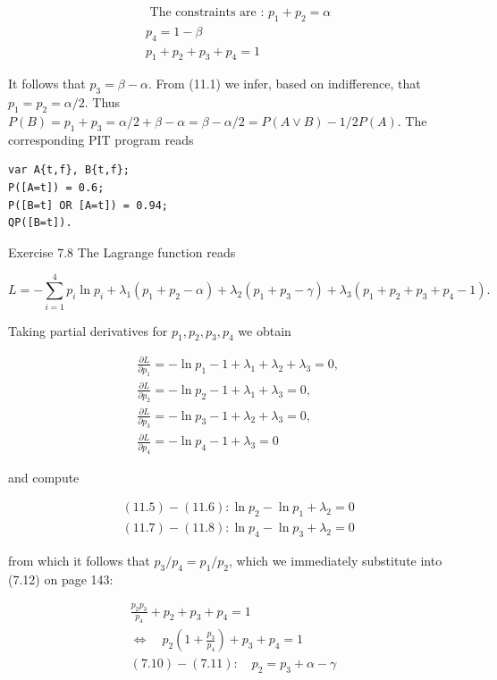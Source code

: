 \documentclass[10pt]{book}
\begin{document}
\begin{align*}
& \text { The constraints are : } p_{1}+p_{2}=\alpha  \tag{11.1}\\
& p_{4}=1-\beta  \tag{11.2}\\
& p_{1}+p_{2}+p_{3}+p_{4}=1 \tag{11.3}
\end{align*}


It follows that $p_{3}=\beta-\alpha$. From (11.1) we infer, based on indifference, that $p_{1}=p_{2}=\alpha / 2$. Thus $P(B)=p_{1}+p_{3}=\alpha / 2+\beta-\alpha=\beta-\alpha / 2=P(A \vee B)-1 / 2 P(A)$. The corresponding PIT program reads

\begin{verbatim}
var A{t,f}, B{t,f};
P([A=t]) = 0.6;
P([B=t] OR [A=t]) = 0.94;
QP([B=t]).
\end{verbatim}

Exercise 7.8 The Lagrange function reads


\begin{equation*}
L=-\sum_{i=1}^{4} p_{i} \ln p_{i}+\lambda_{1}\left(p_{1}+p_{2}-\alpha\right)+\lambda_{2}\left(p_{1}+p_{3}-\gamma\right)+\lambda_{3}\left(p_{1}+p_{2}+p_{3}+p_{4}-1\right) . \tag{11.4}
\end{equation*}


Taking partial derivatives for $p_{1}, p_{2}, p_{3}, p_{4}$ we obtain


\begin{align*}
& \frac{\partial L}{\partial p_{1}}=-\ln p_{1}-1+\lambda_{1}+\lambda_{2}+\lambda_{3}=0,  \tag{11.5}\\
& \frac{\partial L}{\partial p_{2}}=-\ln p_{2}-1+\lambda_{1}+\lambda_{3}=0,  \tag{11.6}\\
& \frac{\partial L}{\partial p_{3}}=-\ln p_{3}-1+\lambda_{2}+\lambda_{3}=0,  \tag{11.7}\\
& \frac{\partial L}{\partial p_{4}}=-\ln p_{4}-1+\lambda_{3}=0 \tag{11.8}
\end{align*}


and compute


\begin{align*}
& (11.5)-(11.6): \ln p_{2}-\ln p_{1}+\lambda_{2}=0  \tag{11.9}\\
& (11.7)-(11.8): \ln p_{4}-\ln p_{3}+\lambda_{2}=0 \tag{11.10}
\end{align*}


from which it follows that $p_{3} / p_{4}=p_{1} / p_{2}$, which we immediately substitute into (7.12) on page 143:


\begin{gather*}
\frac{p_{2} p_{3}}{p_{4}}+p_{2}+p_{3}+p_{4}=1 \\
\Leftrightarrow \quad p_{2}\left(1+\frac{p_{3}}{p_{4}}\right)+p_{3}+p_{4}=1  \tag{11.11}\\
(7.10)-(7.11): \quad p_{2}=p_{3}+\alpha-\gamma
\end{gather*}
\end{document}
